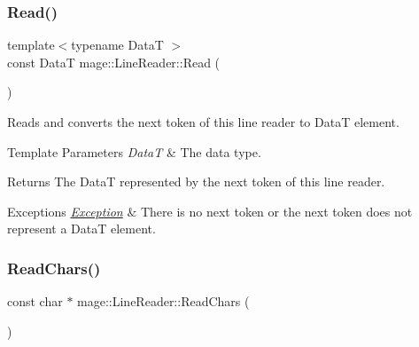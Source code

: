 \hypertarget{classmage_1_1_line_reader_aa1ba5aa332e49bdd63ef4ee4021120fd}{}\label{classmage_1_1_line_reader_aa1ba5aa332e49bdd63ef4ee4021120fd} 
\subsubsection{\texorpdfstring{Read()}{Read()}}
{\footnotesize\ttfamily template$<$typename DataT $>$ \\
const DataT mage\+::\+Line\+Reader\+::\+Read (\begin{DoxyParamCaption}{ }\end{DoxyParamCaption})\hspace{0.3cm}{\ttfamily [protected]}}

Reads and converts the next token of this line reader to {\ttfamily DataT} element.


\begin{DoxyTemplParams}{Template Parameters}
{\em DataT} & The data type. \\
\hline
\end{DoxyTemplParams}
\begin{DoxyReturn}{Returns}
The {\ttfamily DataT} represented by the next token of this line reader. 
\end{DoxyReturn}

\begin{DoxyExceptions}{Exceptions}
{\em \hyperlink{classmage_1_1_exception}{Exception}} & There is no next token or the next token does not represent a {\ttfamily DataT} element. \\
\hline
\end{DoxyExceptions}
\hypertarget{classmage_1_1_line_reader_ad915c1a17549c7758c10f0b6db7e5611}{}\label{classmage_1_1_line_reader_ad915c1a17549c7758c10f0b6db7e5611} 
\subsubsection{\texorpdfstring{Read\+Chars()}{ReadChars()}}
{\footnotesize\ttfamily const char $\ast$ mage\+::\+Line\+Reader\+::\+Read\+Chars (\begin{DoxyParamCaption}{ }\end{DoxyParamCaption})\hspace{0.3cm}{\ttfamily [protected]}}

